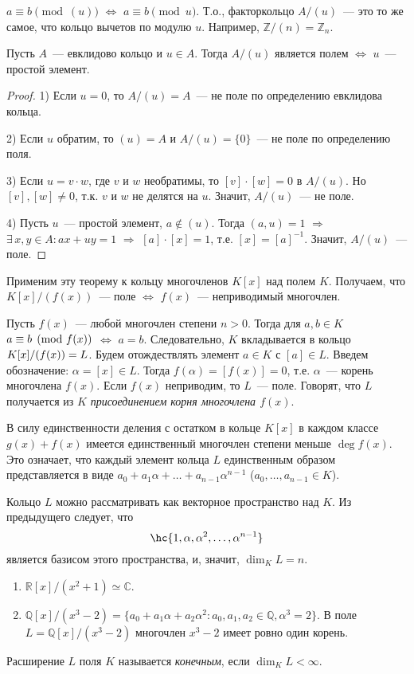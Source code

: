 \documentclass[a4paper]{article}
\newcommand*{\p}[1]{#1\nobreak\discretionary{}{\hbox{$\mathsurround=0pt #1$}}{}}
\begin{document}
$a\equiv b\pmod{(u)}$ $\Leftrightarrow$ $a\equiv b\pmod{u}$. Т.о.,
факторкольцо $A/(u)$~--- это то же самое, что кольцо вычетов по
модулю $u$. Например, $\mathbb{Z}/(n)=\mathbb{Z}_n$.

\begin{theorem}
Пусть $A$~--- евклидово кольцо и $u\in A$. Тогда $A/(u)$ является
полем $\Leftrightarrow$ $u$~--- простой элемент.
\end{theorem}

\begin{proof}
1) Если $u=0$, то $A/(u)=A$~--- не поле по определению евклидова
кольца.

2) Если $u$ обратим, то $(u)=A$ и $A/(u)=\{0\}$~--- не поле по
определению поля.

3) Если $u=v\cdot w$, где $v$ и $w$ необратимы, то $[v]\cdot[w]=0$ в
$A/(u)$. Но $[v],[w]\neq0$, т.к. $v$ и $w$ не делятся на $u$.
Значит, $A/(u)$~--- не поле.

4) Пусть $u$~--- простой элемент, $a\notin(u)$. Тогда $(a,u)=1$
$\Rightarrow$ $\exists \, x,y\in A: ax+uy=1$ $\Rightarrow$
$[a]\cdot[x]=1$, т.е. $[x]=[a]^{-1}$. Значит, $A/(u)$~--- поле.
\end{proof}

Применим эту теорему к кольцу многочленов $K[x]$ над полем $K$.
Получаем, что $K[x]/(f(x))$~--- поле $\Leftrightarrow$ $f(x)$~---
неприводимый многочлен.

Пусть $f(x)$~--- любой многочлен степени $n>0$. Тогда для $a,b\in K$
$a\p\equiv b\pmod{f(x)}$ $\Leftrightarrow$ $a=b$. Следовательно, $K$
вкладывается в кольцо $K[x]/(f(x))\p=L$. Будем отождествлять элемент
$a\in K$ с $[a]\in L$. Введем обозначение: $\alpha=[x]\in L$. Тогда
$f(\alpha)=[f(x)]=0$, т.е. $\alpha$~--- корень многочлена $f(x)$.
Если $f(x)$ неприводим, то $L$~--- поле. Говорят, что $L$ получается
из $K$ \emph{присоединением корня многочлена $f(x)$}.

В силу единственности деления с остатком в кольце $K[x]$ в каждом
классе $g(x)+{f(x)}$ имеется единственный многочлен степени меньше
$\deg f(x)$. Это означает, что каждый элемент кольца $L$
единственным образом представляется в виде
$a_0+a_1\alpha+\ldots+a_{n-1}\alpha^{n-1}$ ($a_0,\ldots,a_{n-1}\in
K$).

Кольцо $L$ можно рассматривать как векторное пространство над $K$.
Из предыдущего следует, что
$$\hc{1,\alpha,\alpha^2,\ldots,\alpha^{n-1}}$$ является базисом этого
пространства, и, значит, $\dim_K L=n$.

\begin{ex}
\begin{enumerate}
  \item $\mathbb{R}[x]/(x^2+1)\simeq \mathbb{C}$.
  \item $\mathbb{Q}[x]/(x^3-2)=\{a_0+a_1\alpha+a_2\alpha^2: a_0,a_1,a_2\in\mathbb{Q},
  \alpha^3=2\}$. В поле $L=\mathbb{Q}[x]/(x^3-2)$ многочлен $x^3-2$
  имеет ровно один корень.
\end{enumerate}
\end{ex}
Расширение $L$ поля $K$ называется \emph{конечным}, если
$\dim_KL<\infty$.
\end{document}

